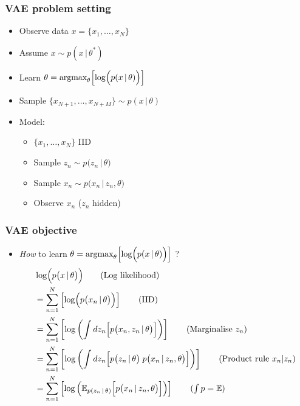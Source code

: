 \documentclass[xcolor=table,dvipsnames]{beamer}
\begin{document}
\begin{frame}[t]
    \frametitle{VAE problem setting}
    \begin{itemize}
        \setlength{\itemsep}{0.8em}
        \item Observe data $x = \{x_1, \dots, x_N\}$
        \item Assume $x \sim p(x \,|\, \theta^*)$
        \item[$\bigstar$] Learn $\theta = \text{argmax}_\theta\Bigl[ \log\Bigl( p(x \,|\, \theta) \Bigr) \Bigr]$
        \item[$\bigstar$] Sample $\{x_{N+1}, \dots, x_{N+M}\}\sim p(x \,|\, \theta)$
        \item Model:
        \begin{itemize}
            \vspace{0.8em}
            \setlength{\itemsep}{0.8em}
            \item $\{x_1, \dots, x_N\}$ IID
            \item Sample $z_n \sim p\bigl( z_n \,\vert\, \theta \bigr)$
            \item Sample $x_n \sim p\bigl( x_n \,\vert\, z_n, \theta \bigr)$
            \item Observe $x_n$ \textcolor{black!40}{($z_n$ hidden)}
        \end{itemize}
    \end{itemize}
\end{frame}

\begin{frame}[t]
    \frametitle{VAE objective}
    \begin{itemize}
        \setlength{\itemsep}{0.5em}
        \item \emph{How} to learn $\theta = \text{argmax}_\theta\Bigl[ \log\Bigl( p(x \,|\, \theta) \Bigr) \Bigr]$ ?
        \begin{align*}
            & \log\Bigl( p\bigl(x \,\vert\, \theta\bigr) \Bigr) \tag{Log likelihood} \\
            &= \sum_{n=1}^N \left[ \log\Bigl( p\bigl(x_n \,\vert\, \theta\bigr) \Bigr) \right] \tag{IID} \\
            &= \sum_{n=1}^N \left[ \log\left( \int dz_n \Bigl[ p\bigl(x_n, z_n \,\vert\, \theta\bigr) \Bigr] \right) \right] \tag{Marginalise $z_n$} \\
            &= \sum_{n=1}^N \left[ \log\left( \int dz_n \Bigl[ p\bigl( z_n \,\vert\, \theta \bigr)\;p\bigl( x_n \,\vert\, z_n, \theta \bigr) \Bigr] \right) \right] \tag{Product rule $x_n | z_n$} \\
            &= \sum_{n=1}^N \left[ \log\left( \mathbb{E}_{p( z_n \,\vert\, \theta )} \Bigl[ p\bigl( x_n \,\vert\, z_n, \theta \bigr) \Bigr] \right) \right] \tag{$\int p = \mathbb{E}$}
        \end{align*}
    \end{itemize}
\end{frame}
\end{document}

